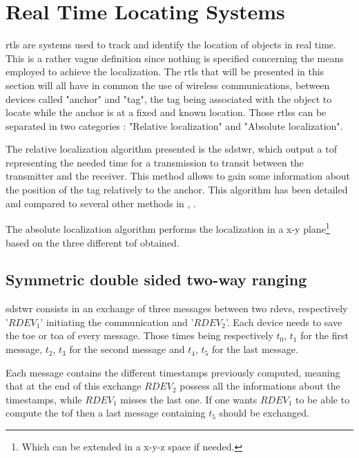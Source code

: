 \section{Real Time Locating Systems}
\label{rtls}
\gls{rtls} are systems used to track and identify the location of objects in real time. This is a rather vague definition since nothing is specified concerning the means employed to achieve the localization. The \gls{rtls} that will be presented in this section will all have in common the use of wireless communications, between devices called "anchor" and "tag", the tag being associated with the object to locate while the anchor is at a fixed and known location. Those \glspl{rtls} can be separated in two categories : "Relative localization" and "Absolute localization".
\vspace{2mm}

The relative localization algorithm presented is the \gls{sdstwr}, which output a \gls{tof} representing the needed time for a transmission to transit between the transmitter and the receiver. This method allows to gain some information about the position of the tag relatively to the anchor. This algorithm has been detailed and compared to several other methods in \cite{fesler2018high}, \cite{hannotier2019indoor}.
\vspace{2mm}

The absolute localization algorithm performs the localization in a x-y plane\footnote{Which can be extended in a x-y-z space if needed.} based on the three different \gls{tof} obtained.


\subsection{Symmetric double sided two-way ranging}
\label{sds2wr}

\gls{sdstwr} consists in an exchange of three messages between two \glspl{rdev}, respectively '$RDEV_1$' initiating the communication and '$RDEV_2$'. Each device needs to save the \gls{toe} or \gls{toa} of every message. Those times being respectively $t_0$, $t_1$ for the first message, $t_2$, $t_3$ for the second message and $t_4$, $t_5$ for the last message.
\vspace{2mm}

Each message contains the different timestamps previously computed, meaning that at the end of this exchange $RDEV_2$ possess all the informations about the timestamps, while $RDEV_1$ misses the last one. If one wants $RDEV_1$ to be able to compute the \gls{tof} then a last message containing $t_5$ should be exchanged.
\vspace{2mm}


